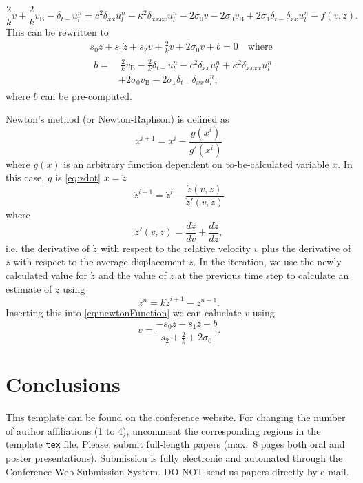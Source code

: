 \documentclass[twoside,a4paper]{article}
\begin{document}
\begin{equation}
\label{eq:stiffStringFDS}
\frac{2}{k}v + \frac{2}{k}v_\text{B} - \delta_{t-}u_l^n =c^2 \delta_{xx} u_l^n -\kappa^2\delta_{xxxx} u_l^n - 2\sigma_0v - 2\sigma_0v_\text{B}
+ 2\sigma_1\delta_{t-}\delta_{xx}u_l^n - f(v, z).
\end{equation}
This can be rewritten to
\begin{align}\label{eq:newtonFunction}
    &s_0z+s_1\dot z+s_2v + \frac{2}{k}v + 2\sigma_0v + b = 0 \quad \text{where} \\
    & \begin{aligned}b =& \: \frac{2}{k}v_\text{B}-\frac{2}{k}\delta_{t-}u_l^n - c^2 \delta_{xx} u_l^n +\kappa^2\delta_{xxxx} u_l^n \\
    &+ 2\sigma_0v_\text{B}
- 2\sigma_1\delta_{t-}\delta_{xx}u_l^n,
\end{aligned}
\end{align}
where $b$ can be pre-computed.

Newton's method (or Newton-Raphson) is defined as
\begin{equation}
    x^{i+1} = x^{i} - \frac{g(x^i)}{g'(x^i)}
\end{equation}
where $g(x)$ is an arbitrary function dependent on to-be-calculated variable $x$.
In this case, $g$ is \eqref{eq:zdot} $x=\dot z$
\begin{equation}
    \dot z^{i+1} = \dot z^i - \frac{\dot z(v, z)}{\dot z'(v,z)}
\end{equation}
where
\begin{equation}
    \dot z'(v, z) = \frac{d\dot z}{dv} + \frac{d\dot z}{dz},
\end{equation}
i.e. the derivative of $\dot z$ with respect to the relative velocity $v$ plus the derivative of $\dot z$ with respect to the average displacement $z$.
In the iteration, we use the newly calculated value for $\dot z$ and the value of $z$ at the previous time step to calculate an estimate of $z$ using
\begin{equation}
    z^n = k\dot z^{i+1} -z^{n-1}.
\end{equation}
Inserting this into \eqref{eq:newtonFunction} we can caluclate $v$ using
\begin{equation}
    v = \frac{-s_0z-s_1\dot z-b}{s_2 + \frac{2}{k} + 2\sigma_0}.
\end{equation}

\section{Conclusions}
This template can be found on the conference website.
For changing the number of author affiliations (1 to 4), uncomment the corresponding regions in the template \texttt{tex} file.
Please, submit full-length papers (max.~8 pages both oral and poster presentations).
Submission is fully electronic and automated through the Conference Web Submission System.
DO NOT send us papers directly by e-mail.
\end{document}
